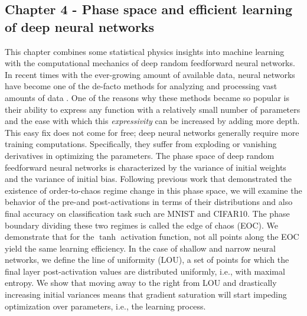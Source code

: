 \subsection{Chapter 4 - Phase space and efficient learning of deep neural networks}
This chapter combines some statistical physics insights into machine learning with the computational mechanics of deep random feedforward neural networks. In recent times with the ever-growing amount of available data, neural networks have become one of the de-facto methods for analyzing and processing vast amounts of data \cite{Mehta_2019}. One of the reasons why these methods became so popular is their ability to express any function with a relatively small number of parameters \cite{MLintro} and the ease with which this \textit{expressivity} can be increased by adding more depth. This easy fix does not come for free; deep neural networks generally require more training computations. Specifically, they suffer from exploding or vanishing derivatives in optimizing the parameters. The phase space of deep random feedforward neural networks is characterized by the variance of initial weights and the variance of initial bias. Following previous work \cite{arxiv.1606.05340,2016arXiv161101232S} that demonstrated the existence of order-to-chaos regime change in this phase space, we will examine the behavior of the pre-and post-activations in terms of their distributions and also final accuracy on classification task such are MNIST and CIFAR10. The phase boundary dividing these two regimes is called the edge of chaos (EOC). We demonstrate that for the $\tanh$ activation function, not all points along the EOC yield the same learning efficiency. In the case of shallow and narrow neural networks, we define the line of uniformity (LOU), a set of points for which the final layer post-activation values are distributed uniformly, i.e., with maximal entropy. We show that moving away to the right from LOU and drastically increasing initial variances means that gradient saturation will start impeding optimization over parameters, i.e., the learning process.    

